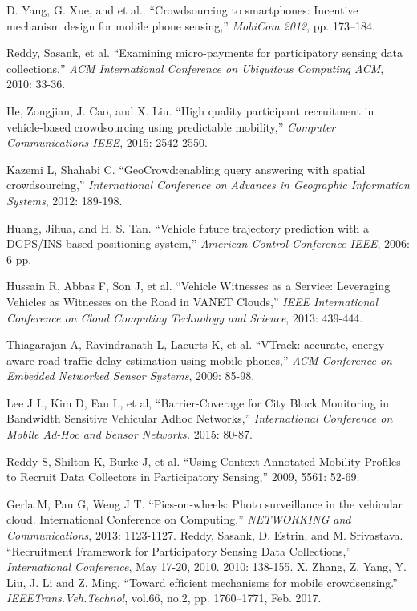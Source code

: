\documentclass[journal]{IEEEtran}
\begin{document}
\begin{thebibliography}{1}
D. Yang, G. Xue, and et al.. ``Crowdsourcing to smartphones: Incentive mechanism design for mobile phone sensing,'' \textit{MobiCom 2012}, pp. 173–184.

Reddy, Sasank, et al. ``Examining micro-payments for participatory sensing data collections,'' \textit{ACM International Conference on Ubiquitous Computing ACM}, 2010: 33-36.

He, Zongjian, J. Cao, and X. Liu. ``High quality participant recruitment in vehicle-based crowdsourcing using predictable mobility,'' \textit{Computer Communications IEEE}, 2015: 2542-2550.

Kazemi L, Shahabi C. ``GeoCrowd:enabling query answering with spatial crowdsourcing,'' \textit{International Conference on Advances in Geographic Information Systems}, 2012: 189-198.

Huang, Jihua, and H. S. Tan. ``Vehicle future trajectory prediction with a DGPS/INS-based positioning system,'' \textit{American Control Conference IEEE}, 2006: 6 pp.

Hussain R, Abbas F, Son J, et al. ``Vehicle Witnesses as a Service: Leveraging Vehicles as Witnesses on the Road in VANET Clouds,'' \textit{IEEE International Conference on Cloud Computing Technology and Science}, 2013: 439-444.

Thiagarajan A, Ravindranath L, Lacurts K, et al. ``VTrack: accurate, energy-aware road traffic delay estimation using mobile phones,'' \textit{ACM Conference on Embedded Networked Sensor Systems}, 2009: 85-98.
 
Lee J L, Kim D, Fan L, et al, ``Barrier-Coverage for City Block Monitoring in Bandwidth Sensitive Vehicular Adhoc Networks,'' \textit{International Conference on Mobile Ad-Hoc and Sensor Networks.} 2015: 80-87.

Reddy S, Shilton K, Burke J, et al. ``Using Context Annotated Mobility Profiles to Recruit Data Collectors in Participatory Sensing,'' 2009, 5561: 52-69.
 
Gerla M, Pau G, Weng J T. ``Pics-on-wheels: Photo surveillance in the vehicular cloud. International Conference on Computing,'' \textit{NETWORKING and Communications}, 2013: 1123-1127.
Reddy, Sasank, D. Estrin, and M. Srivastava. ``Recruitment Framework for Participatory Sensing Data Collections,'' \textit{International Conference}, May 17-20, 2010. 2010: 138-155.
X. Zhang, Z. Yang, Y. Liu, J. Li and Z. Ming. ``Toward efﬁcient mechanisms for mobile crowdsensing.'' \textit{IEEETrans.Veh.Technol}, vol.66, no.2, pp. 1760–1771, Feb. 2017. 


\end{thebibliography}
\end{document}
